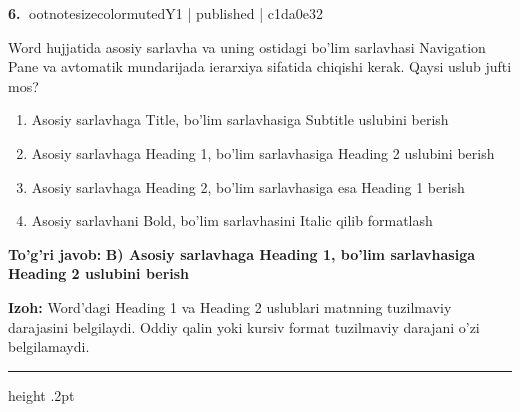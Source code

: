 \documentclass[10pt,a4paper]{article}
\begin{document}
\textbf{\color{ink}6.} {ootnotesizecolor{muted}Y1 | published | c1da0e32}
\par
Word hujjatida asosiy sarlavha va uning ostidagi bo'lim sarlavhasi Navigation Pane va avtomatik mundarijada ierarxiya sifatida chiqishi kerak. Qaysi uslub jufti mos?
\begin{enumerate}[label=\Alph*),leftmargin=9mm]
\item Asosiy sarlavhaga Title, bo'lim sarlavhasiga Subtitle uslubini berish
\item Asosiy sarlavhaga Heading 1, bo'lim sarlavhasiga Heading 2 uslubini berish
\item Asosiy sarlavhaga Heading 2, bo'lim sarlavhasiga esa Heading 1 berish
\item Asosiy sarlavhani Bold, bo'lim sarlavhasini Italic qilib formatlash
\end{enumerate}
\begin{tcolorbox}[enhanced,breakable,colback=teal!4,colframe=teal!55!black,boxrule=0.45pt,arc=1.2mm,left=2.8mm,right=2.8mm,top=2mm,bottom=2mm]
\textbf{\color{teal}To'g'ri javob:} \textbf{B) Asosiy sarlavhaga Heading 1, bo'lim sarlavhasiga Heading 2 uslubini berish}
\par\smallskip
\textbf{Izoh:} Word'dagi Heading 1 va Heading 2 uslublari matnning tuzilmaviy darajasini belgilaydi. Oddiy qalin yoki kursiv format tuzilmaviy darajani o'zi belgilamaydi.
\end{tcolorbox}
\vspace{2mm}\hrule height .2pt\vspace{2mm}
\end{document}
